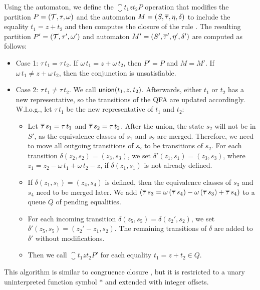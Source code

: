 Using the automaton, we define the $\closure{t_1}{z}{t_2}{P}$ operation that modifies the partition $P = (\mathcal{T}, \tau, \omega)$ and the automaton $M = (S, \overline{\tau}, \eta, \delta)$ to include the equality $t_1 = z + t_2$ and then computes the closure of the rule .
The resulting partition $P' = (\mathcal{T}, \tau', \omega')$ and automaton $M' = (S', \overline{\tau}', \eta', \delta')$  are computed as follows:
\begin{itemize}
  \item Case 1: $\tau\,t_1 = \tau\,t_2$. If $\omega\,t_1 = z + \omega\,t_2$, then $P' = P$ and $M = M'$.
        If $\omega\,t_1 \neq z + \omega\,t_2$, then the conjunction is unsatisfiable.
  \item Case 2: $\tau\,t_1 \neq \tau\,t_2$. We call $\textsf{union}(t_1, z, t_2)$.
        Afterwards, either $t_1$ or $t_2$ has a new representative, so the transitions of the QFA are updated accordingly.
        W.l.o.g., let $\tau\,t_1$ be the new representative of $t_1$ and $t_2$:
        \begin{itemize}
          \item Let $\overline{\tau}\,s_1 = \tau\,t_1$ and $\overline{\tau}\,s_2 = \tau\,t_2$.
                After the union, the state $s_2$ will not be in $S'$, as the equivalence classes of $s_1$ and $s_2$ are merged.
                Therefore, we need to move all outgoing transitions of $s_2$ to be transitions of $s_2$.
                For each transition $\delta(z_2, s_2) = (z_3, s_3)$, we set $\delta'(z_1, s_1) = (z_3, s_3)$, where $z_1 = z_2 - \omega\,t_1 + \omega\,t_2 - z$, if $\delta(z_1,s_1)$ is not already defined.
          \item If $\delta(z_1,s_1) = (z_4, s_4)$ is defined, then the equivalence classes of $s_3$ and $s_4$ need to be merged later.
                We add $(\overline{\tau}\,s_3 = \omega\,(\overline{\tau}\,s_4) - \omega\,(\overline{\tau}\,s_3) + \overline{\tau}\,s_4)$ to a queue $Q$ of pending equalities.
          \item For each incoming transition $\delta(z_5, s_5) = \delta(z_2', s_2)$, we set $\delta'(z_5, s_5) = (z_2' - z_1, s_2)$.
                The remaining transitions of $\delta$ are added to $\delta'$ without modifications.
          \item Then we call $\closure{t_1}{z}{t_2}{P'}$ for each equality $t_1 = z + t_2 \in Q$.
        \end{itemize}
\end{itemize}

This algorithm is similar to congruence closure \cite{cc-tarjan,cc-shostak}, but it is restricted to a unary uninterpreted function symbol $*$ and extended with integer offsets.

